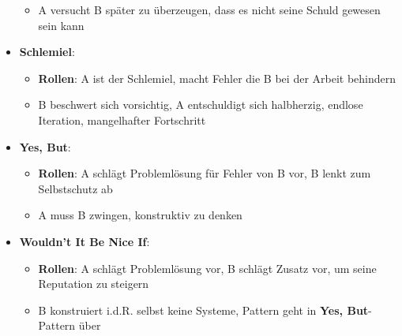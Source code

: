 \begin{itemize}
\begin{itemize}
		\item A versucht B später zu überzeugen, dass es nicht seine Schuld gewesen sein kann
	\end{itemize}
	\item \textbf{Schlemiel}:
	\begin{itemize}
		\item \textbf{Rollen}: A ist der Schlemiel, macht Fehler die B bei der Arbeit behindern
		\item B beschwert sich vorsichtig, A entschuldigt sich halbherzig, endlose Iteration, mangelhafter Fortschritt
	\end{itemize}
	\item \textbf{Yes, But}:
	\begin{itemize}
		\item \textbf{Rollen}: A schlägt Problemlösung für Fehler von B vor, B lenkt zum Selbstschutz ab
		\item A muss B zwingen, konstruktiv zu denken
	\end{itemize}
	\item \textbf{Wouldn't It Be Nice If}:
	\begin{itemize}
		\item \textbf{Rollen}: A schlägt Problemlösung vor, B schlägt Zusatz vor, um seine Reputation zu steigern
		\item B konstruiert i.d.R. selbst keine Systeme, Pattern geht in \textbf{Yes, But}-Pattern über
	\end{itemize}
\end{itemize}
